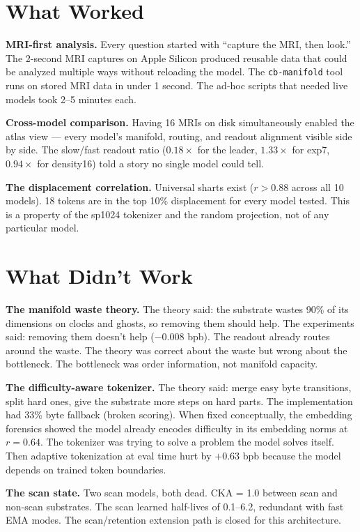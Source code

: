 \documentclass[11pt,a4paper]{report}
\begin{document}
\section{What Worked}

\textbf{MRI-first analysis.} Every question started with ``capture the MRI, then look.'' The 2-second MRI captures on Apple Silicon produced reusable data that could be analyzed multiple ways without reloading the model. The \texttt{cb-manifold} tool runs on stored MRI data in under 1 second. The ad-hoc scripts that needed live models took 2--5 minutes each.

\textbf{Cross-model comparison.} Having 16 MRIs on disk simultaneously enabled the atlas view --- every model's manifold, routing, and readout alignment visible side by side. The slow/fast readout ratio ($0.18\times$ for the leader, $1.33\times$ for exp7, $0.94\times$ for density16) told a story no single model could tell.

\textbf{The displacement correlation.} Universal sharts exist ($r > 0.88$ across all 10 models). 18 tokens are in the top 10\% displacement for every model tested. This is a property of the sp1024 tokenizer and the random projection, not of any particular model.

\section{What Didn't Work}

\textbf{The manifold waste theory.} The theory said: the substrate wastes 90\% of its dimensions on clocks and ghosts, so removing them should help. The experiments said: removing them doesn't help ($-0.008$ bpb). The readout already routes around the waste. The theory was correct about the waste but wrong about the bottleneck. The bottleneck was order information, not manifold capacity.

\textbf{The difficulty-aware tokenizer.} The theory said: merge easy byte transitions, split hard ones, give the substrate more steps on hard parts. The implementation had 33\% byte fallback (broken scoring). When fixed conceptually, the embedding forensics showed the model already encodes difficulty in its embedding norms at $r = 0.64$. The tokenizer was trying to solve a problem the model solves itself. Then adaptive tokenization at eval time hurt by $+0.63$ bpb because the model depends on trained token boundaries.

\textbf{The scan state.} Two scan models, both dead. CKA = 1.0 between scan and non-scan substrates. The scan learned half-lives of 0.1--6.2, redundant with fast EMA modes. The scan/retention extension path is closed for this architecture.
\end{document}
